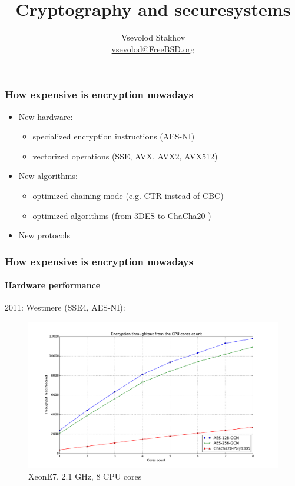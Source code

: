 \documentclass[11pt,t]{beamer}
\title{Cryptography and secure\footnotemark[1] systems \\\vspace{0.5cm} \footnotemark[1] 
{\small in the real world}}
\author{Vsevolod Stakhov \\ \url{vsevolod@FreeBSD.org}}
\newcommand{\cipher}[1]{
	{\color{blue!30} #1}
}
\begin{document}
\begin{frame}[plain]
  \titlepage
\end{frame}

\begin{frame}
\frametitle{How expensive is encryption nowadays}
\begin{itemize}
  \item<1-> New hardware:
  \begin{itemize}
    \item specialized encryption instructions (AES-NI)
    \item vectorized operations (SSE, AVX, AVX2, AVX512)
  \end{itemize}
  \item<2-> New algorithms:
  \begin{itemize}
    \item optimized chaining mode (e.g. CTR instead of CBC)
    \item optimized algorithms (from \cipher{3DES} to \cipher{ChaCha20})
  \end{itemize}
  \item<3-> New protocols
\end{itemize}
\end{frame}

\begin{frame}
\frametitle{How expensive is encryption nowadays}
\framesubtitle{Hardware performance}
2011: Westmere (SSE4, AES-NI):
\begin{figure}[H]
\includegraphics[height=0.6\textheight]{perf-e7.pdf}
\caption{XeonE7, 2.1 GHz, 8 CPU cores}
\end{figure}
\end{frame}
\end{document}
